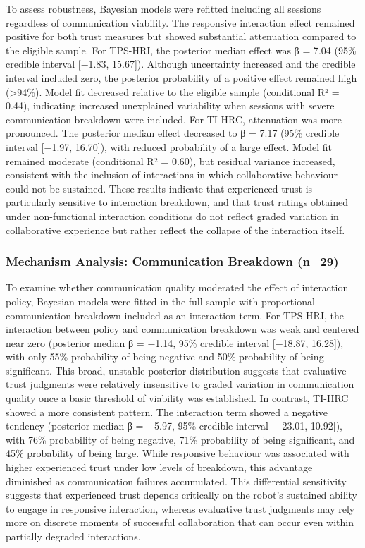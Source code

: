 \documentclass[
  letterpaper,
  DIV=11,
  numbers=noendperiod]{scrartcl}
\begin{document}
To assess robustness, Bayesian models were refitted including all
sessions regardless of communication viability. The responsive
interaction effect remained positive for both trust measures but showed
substantial attenuation compared to the eligible sample. For TPS-HRI,
the posterior median effect was β = 7.04 (95\% credible interval
{[}−1.83, 15.67{]}). Although uncertainty increased and the credible
interval included zero, the posterior probability of a positive effect
remained high (\textgreater94\%). Model fit decreased relative to the
eligible sample (conditional R² = 0.44), indicating increased
unexplained variability when sessions with severe communication
breakdown were included. For TI-HRC, attenuation was more pronounced.
The posterior median effect decreased to β = 7.17 (95\% credible
interval {[}−1.97, 16.70{]}), with reduced probability of a large
effect. Model fit remained moderate (conditional R² = 0.60), but
residual variance increased, consistent with the inclusion of
interactions in which collaborative behaviour could not be sustained.
These results indicate that experienced trust is particularly sensitive
to interaction breakdown, and that trust ratings obtained under
non-functional interaction conditions do not reflect graded variation in
collaborative experience but rather reflect the collapse of the
interaction itself.

\subsubsection{Mechanism Analysis: Communication Breakdown
(n=29)}\label{mechanism-analysis-communication-breakdown-n29}

To examine whether communication quality moderated the effect of
interaction policy, Bayesian models were fitted in the full sample with
proportional communication breakdown included as an interaction term.
For TPS-HRI, the interaction between policy and communication breakdown
was weak and centered near zero (posterior median β = −1.14, 95\%
credible interval {[}−18.87, 16.28{]}), with only 55\% probability of
being negative and 50\% probability of being significant. This broad,
unstable posterior distribution suggests that evaluative trust judgments
were relatively insensitive to graded variation in communication quality
once a basic threshold of viability was established. In contrast, TI-HRC
showed a more consistent pattern. The interaction term showed a negative
tendency (posterior median β = −5.97, 95\% credible interval {[}−23.01,
10.92{]}), with 76\% probability of being negative, 71\% probability of
being significant, and 45\% probability of being large. While responsive
behaviour was associated with higher experienced trust under low levels
of breakdown, this advantage diminished as communication failures
accumulated. This differential sensitivity suggests that experienced
trust depends critically on the robot's sustained ability to engage in
responsive interaction, whereas evaluative trust judgments may rely more
on discrete moments of successful collaboration that can occur even
within partially degraded interactions.
\end{document}

